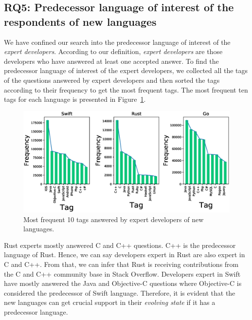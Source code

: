 \subsection{RQ5: Predecessor language of interest of the respondents of new languages}
\label{RQ4}
We have confined our search into the predecessor language of interest of the \emph{expert developers}. According to our definition,  \emph{expert developers} are those developers who have answered at least one accepted answer.
To find the predecessor language of interest of the expert developers, we collected all the tags of the questions answered by expert developers and then sorted the tags according to their frequency to get the most frequent tags. The most frequent ten tags for each language is presented in Figure~\ref{fig:dev skills}.
% 
\begin{figure}[t!]
\centering
\includegraphics[scale=0.35]{figures/Tagfrequency.eps}
\caption{Most frequent 10 tags answered by expert developers of new languages.}
\label{fig:dev skills}
\end{figure}

Rust experts mostly answered  C and C++ questions. C++ is the predecessor language of Rust. Hence, we can say developers expert in Rust are also expert in C and C++. From that, we can infer that Rust is receiving contributions from the C and C++ community base in Stack Overflow. Developers expert in Swift have mostly answered the Java and Objective-C questions where Objective-C is considered the predecessor of Swift language. Therefore, it is evident that the new languages can get crucial support in their \emph{evolving state} if it has a predecessor language.


